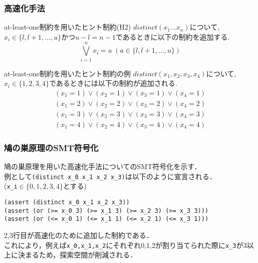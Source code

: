\begin{frame}
    \frametitle{高速化手法}
    \vspace{-3mm}
    \begin{block}{at-least-one制約を用いたヒント制約(H2)}
        $distinct(x_1 ... x_n)$について, $x_i \in \{l, l+1, ..., u\}$かつ$u-l=n-1$であるときに以下の制約を追加する.\\
        \vspace{-3mm}
        $$\bigvee_{i=1}^n x_i=a \; (a \in \{l, l+1, ..., u\})$$
    \end{block}
    \begin{exampleblock}{at-least-one制約を用いたヒント制約の例}
        $distinct(x_1, x_2, x_3, x_4)$について, $x_i \in \{1, 2, 3, 4\}$であるときには以下の制約が追加される.\\
        \vspace{-3mm}
        \begin{eqnarray*}
            (x_1=1) \lor (x_2=1) \lor (x_3=1) \lor (x_4=1)\\
            (x_1=2) \lor (x_2=2) \lor (x_3=2) \lor (x_4=2)\\
            (x_1=3) \lor (x_2=3) \lor (x_3=3) \lor (x_4=3)\\
            (x_1=4) \lor (x_2=4) \lor (x_3=4) \lor (x_4=4)
        \end{eqnarray*}

    \end{exampleblock}
\end{frame}

\begin{frame}[fragile]\small
    \frametitle{鳩の巣原理のSMT符号化}
    鳩の巣原理を用いた高速化手法についてのSMT符号化を示す．\\
    例として\verb|(distinct x_0 x_1 x_2 x_3)|は以下のように宣言される．\\
    (\verb|x_i|$\in \{0,1,2,3,4\}$とする)
    \begin{exampleblock}{}\scriptsize
\begin{verbatim}
(assert (distinct x_0 x_1 x_2 x_3))
(assert (or (>= x_0 3) (>= x_1 3) (>= x_2 3) (>= x_3 3)))
(assert (or (<= x_0 1) (<= x_1 1) (<= x_2 1) (<= x_3 1)))
\end{verbatim}
    \end{exampleblock}
    2,3行目が高速化のために追加した制約である．\\
    これにより，例えば\verb|x_0,x_1,x_2|にそれぞれ0,1,2が割り当てられた際に\verb|x_3|が3以上に決まるため，探索空間が削減される．
\end{frame}


